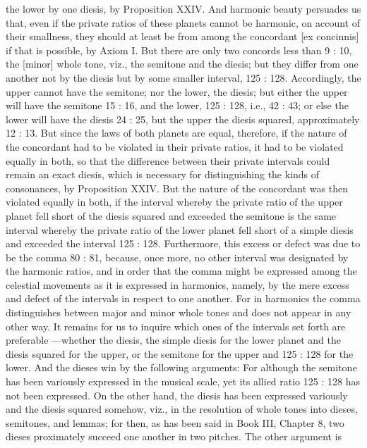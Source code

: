 \documentclass{article}
\begin{document}
the lower by one diesis, by Proposition XXIV. And harmonic beauty
persuades us that, even if the private ratios of these planets cannot be
harmonic, on account of their smallness, they should at least be from
among the concordant [ex concinnis] if that is possible, by Axiom I. But
there are only two concords less than 9 : 10, the [minor] whole tone, viz.,
the semitone and the diesis; but they differ from one another not by the
diesis but by some smaller interval, 125 : 128. Accordingly, the upper
cannot have the semitone; nor the lower, the diesis; but either the upper
will have the semitone 15 : 16, and the lower, 125 : 128, i.e., 42 : 43; or
else the lower will have the diesis 24 : 25, but the upper the diesis
squared, approximately 12 : 13. But since the laws of both planets are
equal, therefore, if the nature of the concordant had to be violated in
their private ratios, it had to be violated equally in both, so that the
difference between their private intervals could remain an exact diesis,
which is necessary for distinguishing the kinds of consonances, by
Proposition XXIV. But the nature of the concordant was then violated
equally in both, if the interval whereby the private ratio of the upper
planet fell short of the diesis squared and exceeded the semitone is the
same interval whereby the private ratio of the lower planet fell short of a
simple diesis and exceeded the interval 125 : 128.
Furthermore, this excess or defect was due to be the comma 80 : 81,
because, once more, no other interval was designated by the harmonic
ratios, and in order that the comma might be expressed among the
celestial movements as it is expressed in harmonics, namely, by the mere
excess and defect of the intervals in respect to one another. For in
harmonics the comma distinguishes between major and minor whole
tones and does not appear in any other way.
It remains for us to inquire which ones of the intervals set forth are
preferable —whether the diesis, the simple diesis for the lower planet
and the diesis squared for the upper, or the semitone for the upper and
125 : 128 for the lower. And the dieses win by the following arguments:
For although the semitone has been variously expressed in the musical
scale, yet its allied ratio 125 : 128 has not been expressed. On the other
hand, the diesis has been expressed variously and the diesis squared
somehow, viz., in the resolution of whole tones into dieses, semitones,
and lemmas; for then, as has been said in Book III, Chapter 8, two dieses
proximately succeed one another in two pitches. The other argument is
\end{document}
